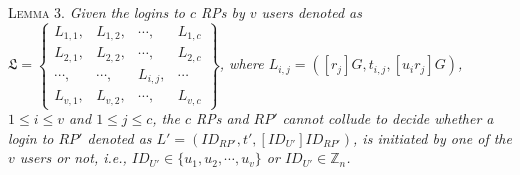 {\oldc
\vspace{1mm}
\noindent\textsc{Lemma 3.} {\em Given
    the logins to $c$ RPs by $v$ users denoted as
 $\mathfrak{L}=\left \{ \begin{matrix}
L_{1,1},&L_{1,2},&\cdots,&L_{1,c}\\
L_{2,1},& L_{2,2},&\cdots,&L_{2,c}\\
\cdots,&\cdots,&L_{i,j},&\cdots\\
L_{v,1},&L_{v,2},&\cdots,&L_{v,c}
\end{matrix}\right\}$, where
 $L_{i, j}=([r_j]G, t_{i,j}, [u_ir_j]G)$, $1 \le i \le v$ and $1 \le j \le c$,
the $c$ RPs and $RP'$ cannot collude to decide whether a login to $RP'$ denoted as $L' = (ID_{RP'}, t', [ID_{U'}]ID_{RP'})$, is initiated by one of the $v$ users or not, i.e., $ID_{U'} \in \{u_1, u_2, \cdots, u_v\}$ or $ID_{U'} \in \mathbb{Z}_n$.}





}
